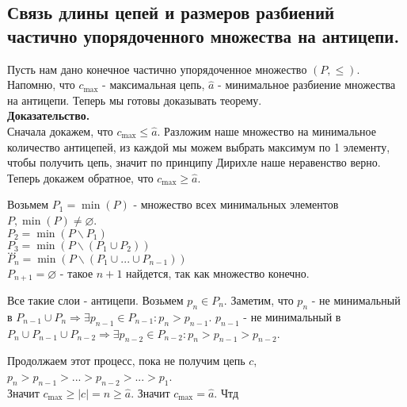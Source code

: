 \subsection{Связь длины цепей и размеров разбиений частично упорядоченного множества на антицепи.}

Пусть нам дано конечное частично упорядоченное множество $(P, \leq)$. Напомню, что $c_{\max}$ - максимальная цепь, $\hat{a}$ - минимальное разбиение множества на антицепи.
Теперь мы готовы доказывать теорему.\\

\noindent \textbf{Доказательство.}\\

Сначала докажем, что $c_{\max} \leq \hat{a}$. Разложим наше множество на минимальное количество антицепей, из каждой мы можем выбрать максимум по 1 элементу,
чтобы получить цепь, значит по принципу Дирихле наше неравенство верно.\\

Теперь докажем обратное, что $c_{\max} \geq \hat{a}$.

\begin{center}
    Возьмем $P_1 = \min (P)$ - множество всех минимальных элементов $P, \min (P) \neq \varnothing$.\\
    $P_2 = \min(P \backslash P_1)$\\
    $P_3 = \min(P \backslash (P_1 \cup P_2))$\\
    $\dots$\\
    $P_n = \min(P \backslash (P_1 \cup ... \cup P_{n - 1}))$\\
    $P_{n + 1} = \varnothing$ - такое $n + 1$ найдется, так как множество конечно.
\end{center}

Все такие слои - антицепи. Возьмем $p_n \in P_n$. Заметим, что $p_n$ - не минимальный в $P_{n - 1} \cup P_n \Rightarrow \exists p_{n - 1} \in P_{n - 1} : p_n > p_{n - 1}$.
$p_{n - 1}$ - не минимальный в $P_n \cup P_{n - 1} \cup P_{n - 2} \Rightarrow \exists p_{n - 2} \in P_{n - 2} : p_n > p_{n - 1} > p_{n - 2}$.

Продолжаем этот процесс, пока не получим цепь $c$, $p_n > p_{n - 1} > ... > p_{n - 2} > ... > p_1$.\\

Значит $c_{\max} \geq |c| = n \geq \hat{a}$. Значит $c_{\max} = \hat{a}$. Чтд
